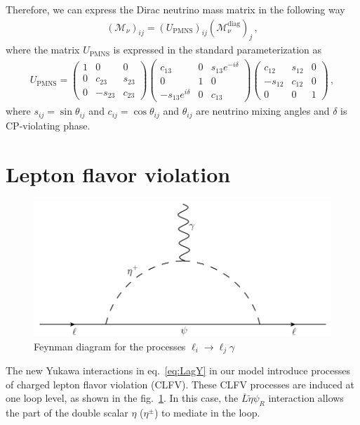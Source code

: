 \documentclass[12pt]{article}
\begin{document}
Therefore, we can express the Dirac neutrino mass matrix in the
following way
\begin{align}
(\mathcal{M}_{\nu})_{ij} = (U_{\text{PMNS}})_{ij} (\mathcal{M}_{\nu}^{\text{diag}})_{j}\,,
\end{align}
where the matrix $U_{\text{PMNS}}$ is expressed in the standard parameterization as
\begin{align*}
U_{\text{PMNS}} = \begin{pmatrix}
    1 & 0		& 0 \\
    0 & c_{23}  & s_{23} \\
    0 & -s_{23} & c_{23}
\end{pmatrix}
\begin{pmatrix}
    c_{13}  &  0 & s_{13}e^{-i\delta} \\
    0 		&  1 & 0 \\
    -s_{13}e^{i\delta} &  0 & c_{13}
\end{pmatrix}
\begin{pmatrix}
    c_{12}  & s_{12} & 0 \\
    -s_{12} & c_{12} & 0 \\
    0		& 0		 & 1
\end{pmatrix}\,,
\end{align*}
where $s_{ij} = \sin \theta_{ij}$ and $c_{ij} = \cos \theta_{ij}$ and $\theta_{ij}$ are neutrino mixing angles and $\delta$ is CP-violating phase.

\section{Lepton flavor violation}
\label{sec:LFV}
%
\begin{figure}
\centering
\includegraphics[scale=0.75]{LFV.pdf}
\caption{Feynman diagram for the processes $\ell_{i} \to \ell_{j} \gamma$}
\label{fig:LFV}
\end{figure}
%
The new Yukawa interactions in eq.~\eqref{eq:LagY} in our model introduce processes of charged lepton flavor violation (CLFV). These CLFV processes are induced at one loop level, as shown in the fig.~\ref{fig:LFV}. In this case, the $\overline{L} \tilde{\eta} \psi_R$ interaction allows the part of the double scalar $\eta$ ($\eta^{\pm}$) to mediate in the loop.
\end{document}
